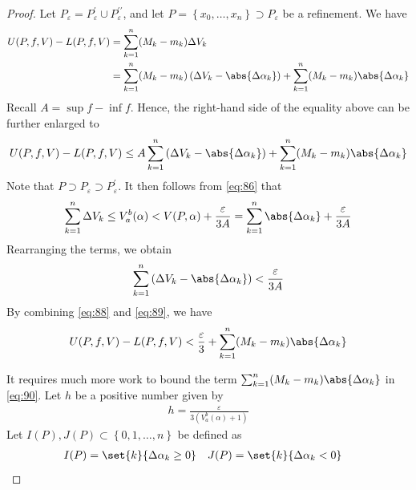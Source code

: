 \documentclass[thmcnt=section, 12pt]{elegantbook}
\begin{document}
\begin{proof}
    \par Let $P_\varepsilon = P^\prime_\varepsilon \cup P^{\prime\prime}_\varepsilon$, and let $P = \left\{x_0, \ldots, x_n\right\} \supset P_\varepsilon$ be a refinement. We have 
    \begin{align*}
        U(P,f,V) - L(P,f,V)
        &= \sum_{k=1}^n (M_k - m_k) \Delta V_k \\ 
        &= \sum_{k=1}^n (M_k - m_k) \left( \Delta V_k - \abs{\Delta\alpha_k} \right)
        + \sum_{k=1}^n (M_k - m_k) \abs{\Delta\alpha_k}
    \end{align*}
    Recall $A = \sup f - \inf f$. Hence, the right-hand side of the equality above can be further enlarged to
    \begin{align}
        U(P,f,V) - L(P,f,V)
        \leq A \sum_{k=1}^n \left( \Delta V_k - \abs{\Delta\alpha_k} \right)
        + \sum_{k=1}^n (M_k - m_k) \abs{\Delta\alpha_k}
        \label{eq:88}
    \end{align}
    Note that $P \supset P_\varepsilon \supset P^\prime_\varepsilon$. It then follows from \eqref{eq:86} that 
    \begin{align*}
        \sum_{k=1}^n \Delta V_k
        \leq V_a^b(\alpha) 
        < V(P, \alpha)
        + \frac{\varepsilon}{3A}
        = \sum_{k=1}^n \abs{\Delta\alpha_k}
        + \frac{\varepsilon}{3A}
    \end{align*}
    Rearranging the terms, we obtain 
    \begin{align}
        \sum_{k=1}^n \left( \Delta V_k - \abs{\Delta\alpha_k} \right)
        < \frac{\varepsilon}{3A}
        \label{eq:89}
    \end{align}
    By combining \eqref{eq:88} and \eqref{eq:89}, we have 
    \begin{align}
        U(P,f,V) - L(P,f,V)
        < \frac{\varepsilon}{3}
        + \sum_{k=1}^n (M_k - m_k) \abs{\Delta\alpha_k}
        \label{eq:90}
    \end{align}

    \par It requires much more work to bound the term $\sum_{k=1}^n (M_k - m_k) \abs{\Delta\alpha_k}$ in \eqref{eq:90}. Let $h$ be a positive number given by 
    \begin{align*}
        h = \frac{\varepsilon}{3(V_a^b (\alpha) + 1)}
    \end{align*}
    Let $I(P), J(P) \subset \left\{0, 1, \ldots, n\right\}$ be defined as 
    \begin{align*}
        I(P) &= \set{k}{\Delta\alpha_k \geq 0} & 
        J(P) &= \set{k}{\Delta\alpha_k < 0}
    \end{align*}


\end{proof}
\end{document}
